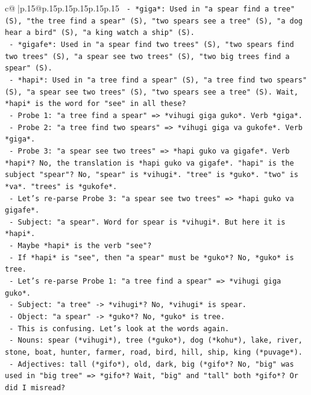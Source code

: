 \documentclass{article}
\begin{document}
{\begin{supertabular}{c@{$\;$}|p{.15\linewidth}@{}p{.15\linewidth}p{.15\linewidth}p{.15\linewidth}p{.15\linewidth}p{.15\linewidth}}
{{{\texttt{      {-} *giga*: Used in "a spear find a tree" (S), "the tree find a spear" (S), "two spears see a tree" (S), "a dog hear a bird" (S), "a king watch a ship" (S).} \\
\texttt{      {-} *gigafe*: Used in "a spear find two trees" (S), "two spears find two trees" (S), "a spear see two trees" (S), "two big trees find a spear" (S).} \\
\texttt{      {-} *hapi*: Used in "a tree find a spear" (S), "a tree find two spears" (S), "a spear see two trees" (S), "two spears see a tree" (S). Wait, *hapi* is the word for "see" in all these?} \\
\texttt{        {-} Probe 1: "a tree find a spear" => *vihugi giga guko*. Verb *giga*.} \\
\texttt{        {-} Probe 2: "a tree find two spears" => *vihugi giga va gukofe*. Verb *giga*.} \\
\texttt{        {-} Probe 3: "a spear see two trees" => *hapi guko va gigafe*. Verb *hapi*? No, the translation is *hapi guko va gigafe*. "hapi" is the subject "spear"? No, "spear" is *vihugi*. "tree" is *guko*. "two" is *va*. "trees" is *gukofe*.} \\
\texttt{        {-} Let's re{-}parse Probe 3: "a spear see two trees" => *hapi guko va gigafe*.} \\
\texttt{          {-} Subject: "a spear". Word for spear is *vihugi*. But here it is *hapi*.} \\
\texttt{          {-} Maybe *hapi* is the verb "see"?} \\
\texttt{          {-} If *hapi* is "see", then "a spear" must be *guko*? No, *guko* is tree.} \\
\texttt{          {-} Let's re{-}parse Probe 1: "a tree find a spear" => *vihugi giga guko*.} \\
\texttt{            {-} Subject: "a tree" {-}> *vihugi*? No, *vihugi* is spear.} \\
\texttt{            {-} Object: "a spear" {-}> *guko*? No, *guko* is tree.} \\
\texttt{            {-} This is confusing. Let's look at the words again.} \\
\texttt{            {-} Nouns: spear (*vihugi*), tree (*guko*), dog (*kohu*), lake, river, stone, boat, hunter, farmer, road, bird, hill, ship, king (*puvage*).} \\
\texttt{            {-} Adjectives: tall (*gifo*), old, dark, big (*gifo*? No, "big" was used in "big tree" => *gifo*? Wait, "big" and "tall" both *gifo*? Or did I misread?} \\
}}}
\end{supertabular}}
\end{document}
